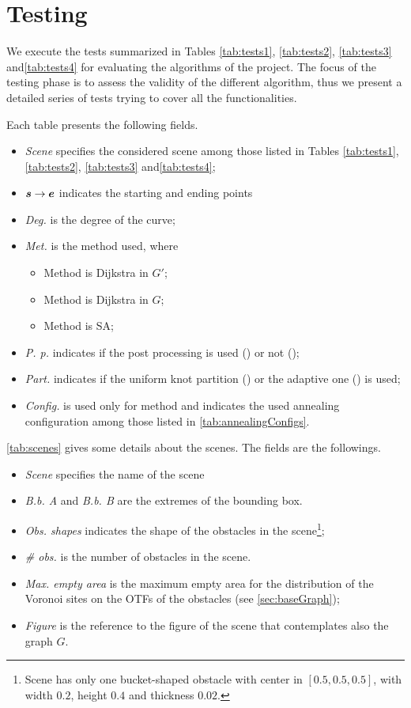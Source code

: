 \documentclass[dissertation.tex]{subfiles}
\begin{document}
\chapter{Testing}\label{cha:testing}
We execute the tests summarized in Tables
\ref{tab:tests1}, \ref{tab:tests2},
\ref{tab:tests3} and\ref{tab:tests4} for evaluating the algorithms of the project. The
focus of the testing phase is to assess the validity of the different
algorithm, thus we present a detailed series of tests trying to cover
all the functionalities.

Each
table presents the following fields.
\begin{itemize}
\item \emph{Scene} specifies the considered scene among those listed
  in Tables \ref{tab:tests1}, \ref{tab:tests2},
\ref{tab:tests3} and\ref{tab:tests4};
\item $\boldsymbol{s}\rightarrow\boldsymbol{e}$ indicates the starting and ending points
\item \emph{Deg.} is the degree of the \bs curve;
\item \emph{Met.} is the method used, where
  \begin{itemize}
  \item Method \metA is Dijkstra in $G'$;
  \item Method \metB is Dijkstra in $G$;
  \item Method \metC is \acl{SA};
  \end{itemize}
\item \emph{P. p.} indicates if the post processing is used (\ypp) or
  not (\npp);
\item \emph{Part.} indicates if the uniform knot partition
  (\ukp) or the adaptive one (\akp) is used;
\item \emph{Config.} is used only for method \metC and indicates the
  used annealing configuration among those listed in \cref{tab:annealingConfigs}.
\end{itemize}

\cref{tab:scenes} gives some details about the scenes. The fields are
the followings.
\begin{itemize}
\item \emph{Scene} specifies the name of the scene
\item \emph{B.b. A} and \emph{B.b. B} are the extremes of the bounding
  box.
\item \emph{Obs. shapes} indicates the shape of the obstacles in the
  scene\footnote{Scene \sceneC has only one bucket-shaped obstacle
    with center in $[0.5,0.5,0.5]$, with width $0.2$, height $0.4$ and
    thickness $0.02$.}; 
\item \emph{\# obs.} is the number of obstacles in the scene.
\item \emph{Max. empty area} is the maximum empty area for the
  distribution of the Voronoi sites on the \acp{OTF} of the obstacles
  (see \cref{sec:baseGraph});
\item \emph{Figure} is the reference to the figure of the scene that
  contemplates also the graph $G$.
\end{itemize}
\end{document}
